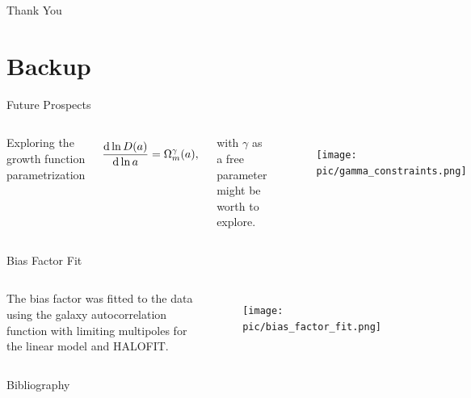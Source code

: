 \documentclass[serif, aspectratio=169]{beamer}
\begin{document}
\begin{frame}
    \begin{center}
        {\Huge\calligra Thank You}
    \end{center}
\end{frame}

\section*{Backup}

\begin{frame}{Future Prospects}
	\begin{columns}
	
	Exploring the growth function parametrization \cite{growth_model}

    \begin{equation}\label{growth_func_new}
		\dv{\ln{D(a)}}{\ln{a}}=\Omega_m^\gamma (a),
	\end{equation}
	
	with $\gamma$ as a free parameter \cite{growth_constraint} might be worth to explore.
	
	
	\begin{figure}
	\centering
	\texttt{[image: pic/gamma\_constraints.png]}
	\end{figure}
	\end{columns}
\end{frame}

\begin{frame}{Bias Factor Fit}
	\begin{columns}
	\column{0.5\linewidth}
	The bias factor was fitted to the data using the galaxy autocorrelation function with limiting multipoles for the linear model and HALOFIT.
	\column{0.5\linewidth}
	\begin{figure}
	\centering
	\texttt{[image: pic/bias\_factor\_fit.png]}
	\end{figure}
	\end{columns}
\end{frame}

\begin{frame}[allowframebreaks]{Bibliography}
\printbibliography
\end{frame}
\end{document}
